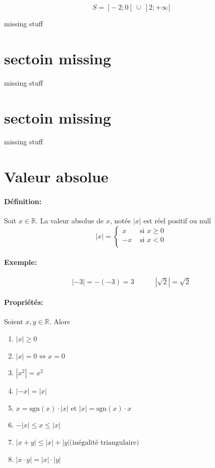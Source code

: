 \documentclass[
    11pt,
    a4paper,
    oneside,
    headinlcude, footinclude,
    twoside,
]{report}
\begin{document}
$$S =\ ]-2; 0[\ \cup\ ] 2; +\infty[$$



 missing stuff


\section{sectoin missing}
\label{sec:sectoin_missing}
 missing stuff


\section{sectoin missing}
\label{sec:sectoin_missing}

 missing stuff


\section{Valeur absolue}
\label{sec:valeur_absolue}

\paragraph{Définition:}

Soit $x \in \mathbb{R}$. La valeur absolue de $x$, not\'ee $|x|$ est r\'eel
positif ou null
$$ |x| = \left\{
    \begin{array}{ll}
    x & \text{ si } x \geq 0\\
    -x & \text{ si } x < 0\\
    \end{array}
\right. $$

\paragraph{Exemple:}

$$|-3| = - (-3) = 3 \quad \quad \quad |\sqrt{2}| = \sqrt{2}$$

\paragraph{Propriétés:}

Soient $x, y \in \mathbb{R}$. Alors 
\begin{enumerate}
    \item $|x| \geq 0$
    \item $|x| = 0 \iff x = 0$
    \item $|x^{2}| = x^{2}$
    \item $|-x| = |x|$
    \item $x = \text{sgn}(x) \cdot |x| \text{ et } |x| = \text{sgn} (x) \cdot x$
    \item $-|x| \leq x \leq |x|$
    \item $|x + y| \leq |x| + |y| \text{(inégalité triangulaire)}$
    \item $|x\cdot y| = |x| \cdot |y|$
\end{enumerate}
\end{document}
